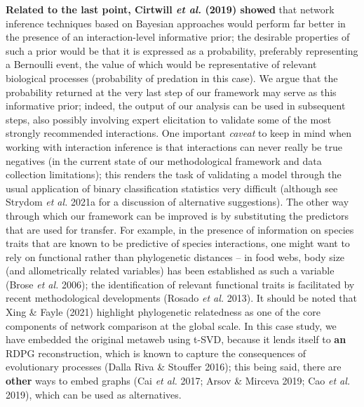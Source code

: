 \documentclass[11pt]{article}
\makeatletter
\def\maxwidth{\ifdim\Gin@nat@width>\linewidth\linewidth
\else\Gin@nat@width\fi}
\let\Oldincludegraphics\includegraphics
\renewcommand{\includegraphics}[1]{\Oldincludegraphics[width=\maxwidth]{#1}}
\providecommand{\DIFaddtex}[1]{{\bf #1}} %
\providecommand{\DIFdeltex}[1]{} %
\providecommand{\DIFaddbegin}{\protect\color{blue}} %
\providecommand{\DIFaddend}{\protect\color{black}} %
\providecommand{\DIFdelbegin}{\protect\color{red}} %
\providecommand{\DIFdelend}{\protect\color{black}} %
\providecommand{\DIFadd}[1]{\texorpdfstring{\DIFaddtex{#1}}{#1}} %
\providecommand{\DIFdel}[1]{\texorpdfstring{\DIFdeltex{#1}}{}} %
\newcommand{\DIFscaledelfig}{0.5}
\newlength{\DIFdelgraphicswidth} %
\newlength{\DIFdelgraphicsheight} %
\newcommand{\DIFaddincludegraphics}[2][]{{\color{blue}\fbox{\DIFOincludegraphics[#1]{#2}}}} %
\newcommand{\DIFdelincludegraphics}[2][]{%
\sbox{\DIFdelgraphicsbox}{\DIFOincludegraphics[#1]{#2}}%
\settoboxwidth{\DIFdelgraphicswidth}{\DIFdelgraphicsbox} %
\settoboxtotalheight{\DIFdelgraphicsheight}{\DIFdelgraphicsbox} %
\scalebox{\DIFscaledelfig}{%
\parbox[b]{\DIFdelgraphicswidth}{\usebox{\DIFdelgraphicsbox}\\[-\baselineskip] \rule{\DIFdelgraphicswidth}{0em}}\llap{\resizebox{\DIFdelgraphicswidth}{\DIFdelgraphicsheight}{%
\setlength{\unitlength}{\DIFdelgraphicswidth}%
\begin{picture}(1,1)%
\thicklines\linethickness{2pt} %
{\color[rgb]{1,0,0}\put(0,0){\framebox(1,1){}}}%
{\color[rgb]{1,0,0}\put(0,0){\line( 1,1){1}}}%
{\color[rgb]{1,0,0}\put(0,1){\line(1,-1){1}}}%
\end{picture}%
}\hspace*{3pt}}} %
} %
\DeclareRobustCommand{\DIFaddbegin}{\DIFOaddbegin \let\includegraphics\DIFaddincludegraphics} %
\DeclareRobustCommand{\DIFaddend}{\DIFOaddend \let\includegraphics\DIFOincludegraphics} %
\DeclareRobustCommand{\DIFdelbegin}{\DIFOdelbegin \let\includegraphics\DIFdelincludegraphics} %
\DeclareRobustCommand{\DIFdelend}{\DIFOaddend \let\includegraphics\DIFOincludegraphics} %
\makeatother
\begin{document}
\DIFadd{Related to the last point, Cirtwill \emph{et al.} (2019) showed }\DIFaddend that
network inference techniques based on Bayesian approaches would perform
far better in the presence of an interaction-level informative prior;
the desirable properties of such a prior would be that it is expressed
as a probability, preferably representing a Bernoulli event, the value
of which would be representative of relevant biological processes
(probability of predation in this case). We argue that the probability
returned at the very last step of our framework may serve as this
informative prior; indeed, the output of our analysis can be used in
subsequent steps, also possibly involving expert elicitation to validate
some of the most strongly recommended interactions. One important
\emph{caveat} to keep in mind when working with interaction inference is
that interactions can never really be true negatives (in the current
state of our methodological framework and data collection limitations);
this renders the task of validating a model through the usual
application of binary classification statistics very difficult (although
see Strydom \emph{et al.} 2021a for a discussion of alternative
suggestions). The other way through which our framework can be improved
is by substituting the predictors that are used for transfer. For
example, in the presence of information on species traits that are known
to be predictive of species interactions, one might want to rely on
functional rather than phylogenetic distances -- in food webs, body size
(and allometrically related variables) has been established as such a
variable (Brose \emph{et al.} 2006); the identification of relevant
functional traits is facilitated by recent methodological developments
(Rosado \emph{et al.} 2013). It should be noted that Xing \& Fayle
(2021) highlight phylogenetic relatedness as one of the core components
of network comparison at the global scale. In this case study, we have
embedded the original metaweb using t-SVD, because it lends itself to \DIFdelbegin \DIFdel{a
}\DIFdelend \DIFaddbegin \DIFadd{an
}\DIFaddend RDPG reconstruction, which is known to capture the consequences of
evolutionary processes (Dalla Riva \& Stouffer 2016); this being said,
there are \DIFdelbegin \DIFdel{others }\DIFdelend \DIFaddbegin \DIFadd{other }\DIFaddend ways to embed graphs (Cai \emph{et al.} 2017; Arsov \&
Mirceva 2019; Cao \emph{et al.} 2019), which can be used as
alternatives.
\end{document}
